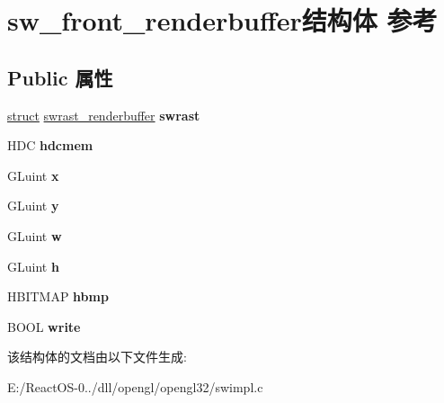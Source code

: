 \hypertarget{structsw__front__renderbuffer}{}\section{sw\+\_\+front\+\_\+renderbuffer结构体 参考}
\label{structsw__front__renderbuffer}
\subsection*{Public 属性}
\begin{DoxyCompactItemize}
\item 
\mbox{\label{structsw__front__renderbuffer_a2e3fa48c7e76b53b4f9f907138c46fcb}} 
\hyperlink{interfacestruct}{struct} \hyperlink{structswrast__renderbuffer}{swrast\+\_\+renderbuffer} {\bfseries swrast}
\item 
\mbox{\label{structsw__front__renderbuffer_a3f4acb6d2403ffc406b3feecabacf30f}} 
H\+DC {\bfseries hdcmem}
\item 
\mbox{\label{structsw__front__renderbuffer_a5943acb13150b56b7b3cebe09d00e08f}} 
G\+Luint {\bfseries x}
\item 
\mbox{\label{structsw__front__renderbuffer_ac22ba51044966413e8cfef541375762e}} 
G\+Luint {\bfseries y}
\item 
\mbox{\label{structsw__front__renderbuffer_a5e7e93606c5e10bf6e7600d228e7e37b}} 
G\+Luint {\bfseries w}
\item 
\mbox{\label{structsw__front__renderbuffer_a20b3862f9ee100f3a8869ad56dc912f2}} 
G\+Luint {\bfseries h}
\item 
\mbox{\label{structsw__front__renderbuffer_a8284bb7e1d4a97cc1ccc5ff46e235bb3}} 
H\+B\+I\+T\+M\+AP {\bfseries hbmp}
\item 
\mbox{\label{structsw__front__renderbuffer_a9134614427e2cfdd6a5fb2263d8e9c46}} 
B\+O\+OL {\bfseries write}
\end{DoxyCompactItemize}


该结构体的文档由以下文件生成\+:\begin{DoxyCompactItemize}
\item 
E\+:/\+React\+O\+S-\/0../dll/opengl/opengl32/swimpl.\+c\end{DoxyCompactItemize}
